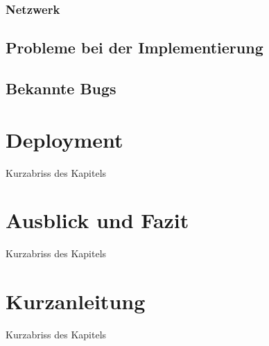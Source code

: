 \subsection{Netzwerk}




\section{Probleme bei der Implementierung}

\section{Bekannte Bugs}


\chapter{Deployment}

Kurzabriss des Kapitels

\chapter{Ausblick und Fazit}

Kurzabriss des Kapitels

\chapter{Kurzanleitung}

Kurzabriss des Kapitels

		
   	\cleardoublepage
   	\setcounter{page}{12}
	 
	
\begin{appendix}   
\end{appendix}
\backmatter


